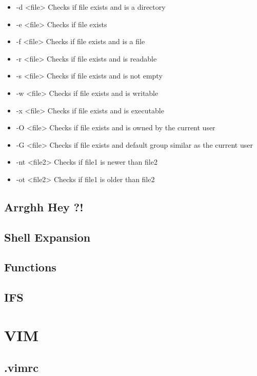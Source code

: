 \documentclass[12pt,a4paper]{article}
\begin{document}
\begin{itemize}
	\item -d <file>  Checks if file exists and is a directory
	\item -e <file>  Checks if file exists
	\item -f <file>  Checks if file exists and is a file
	\item -r <file>  Checks if file exists and is readable
	\item -s <file>  Checks if file exists and is not empty
	\item -w <file>  Checks if file exists and is writable
	\item -x <file>  Checks if file exists and is executable
	\item -O <file>  Checks if file exists and is owned by the current user
    \item -G <file>  Checks if file exists and default group similar as the current user
	\item <file1> -nt <file2>    Checks if file1 is newer than file2
	\item <file1> -ot <file2>    Checks if file1 is older than file2
\end{itemize}

\subsection{Arrghh Hey ?!}


\subsection{Shell Expansion}

\subsection{Functions}

\subsection{IFS}

\section{VIM}
\subsection{.vimrc}
\end{document}
